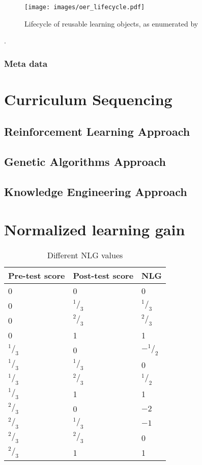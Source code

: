 \begin{figure}[h!]
	\centering
	\texttt{[image: images/oer\_lifecycle.pdf]}
	\caption[Lifecycle of reusable learning objects]{Lifecycle of reusable learning objects, as enumerated by \citep{Collis2004}}
	\label{fig:oer_lifecycle}
\end{figure}
.
\subsubsection{Meta data}


\section{Curriculum Sequencing}
\subsection{Reinforcement Learning Approach}
\subsection{Genetic Algorithms Approach}
\subsection{Knowledge Engineering Approach}

\section{Normalized learning gain}
\begin{table}
	\centering
	\begin{tabular}{lll}\hline
		\textbf{Pre-test score} & \textbf{Post-test score} & \textbf{NLG} \\\hline
		0		& 0			& 0 \\
		0		& $^1/_3$	& $^1/_3$\\
		0		& $^2/_3$	& $^2/_3$\\
		0		& 1			& 1\\
		$^1/_3$	& 0			& $-^1/_2$\\
		$^1/_3$	& $^1/_3$	& 0\\
		$^1/_3$	& $^2/_3$	& $^1/_2$\\
		$^1/_3$	& 1			& 1\\
		$^2/_3$	& 0			& $-2$\\
		$^2/_3$	& $^1/_3$	& $-1$\\
		$^2/_3$	& $^2/_3$	& 0\\
		$^2/_3$	& 1			& 1\\
	\end{tabular}
	\caption{Different NLG values}
	\label{tab:nlg_values}
\end{table}


